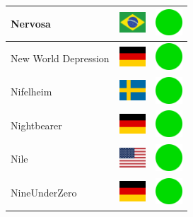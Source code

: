 \documentclass[12pt, a4paper, twoside]{report}
\begin{document}
\begin{center}
\begin{longtable}{|p{5cm}|p{2cm}|p{2cm}|}
 Nervosa                                                    & \includegraphics[width=1cm]{../img/flags/br} &   \includegraphics[width=1cm]{../likes/y} \\ \hline
 New World Depression                                       & \includegraphics[width=1cm]{../img/flags/de} &   \includegraphics[width=1cm]{../likes/y} \\ \hline
 Nifelheim                                                  & \includegraphics[width=1cm]{../img/flags/se} &   \includegraphics[width=1cm]{../likes/y} \\ \hline
 Nightbearer                                                & \includegraphics[width=1cm]{../img/flags/de} &   \includegraphics[width=1cm]{../likes/y} \\ \hline
 Nile                                                       & \includegraphics[width=1cm]{../img/flags/us} &   \includegraphics[width=1cm]{../likes/y} \\ \hline
 NineUnderZero                                              & \includegraphics[width=1cm]{../img/flags/de} &   \includegraphics[width=1cm]{../likes/y} \\ \hline

\end{longtable}
\end{center}
\end{document}
